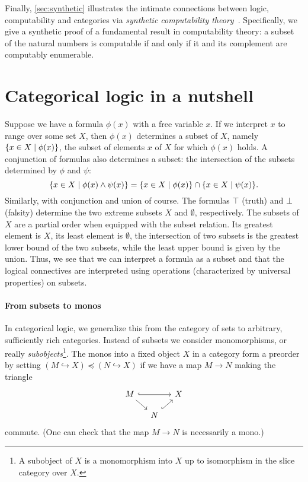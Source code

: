 Finally, \cref{sec:synthetic} illustrates the intimate connections between
logic, computability and categories via \emph{synthetic computability
  theory}~\cite{Bauer2006}. Specifically, we give a synthetic proof of a
fundamental result in computability theory: a subset of the natural numbers is
computable if and only if it and its complement are computably enumerable.


\section{Categorical logic in a nutshell}\label{sec:categorical-logic}
Suppose we have a formula \(\phi(x)\) with a free variable \(x\). If we
interpret \(x\) to range over some set \(X\), then \(\phi(x)\) determines a
subset of \(X\), namely \(\{x \in X \mid \phi(x)\}\), the subset of elements
\(x\) of \(X\) for which \(\phi(x)\) holds.
%
A conjunction of formulas also determines a subset: the
intersection of the subsets determined by \(\phi\) and \(\psi\):
\[
  \{x \in X \mid \phi(x) \land \psi(x)\}
  = \{x \in X \mid \phi(x)\} \cap \{x \in X \mid \psi(x)\}.
\]
Similarly, with conjunction and union of course.
%
The formulas \(\top\) (truth) and \(\bot\) (falsity) determine the two extreme
subsets \(X\) and \(\emptyset\), respectively.
%
The subsets of \(X\) are a partial order when equipped with the subset
relation. Its greatest element is \(X\), its least element is \(\emptyset\), the
intersection of two subsets is the greatest lower bound of the two subsets,
while the least upper bound is given by the union.
%
Thus, we see that we can interpret a formula as a subset and that the logical
connectives are interpreted using operations (characterized by universal
properties) on subsets.

\paragraph{From subsets to monos}
In categorical logic, we generalize this from the category of sets to arbitrary,
sufficiently rich categories.
%
Instead of subsets we consider monomorphisms, or really
\emph{subobjects}\footnote{A subobject of \(X\) is a monomorphism into
  \(X\) up to isomorphism in the slice category over \(X\).}.
%
The monos into a fixed object \(X\) in a category form a preorder by setting
\((M \hookrightarrow X) \preceq (N \hookrightarrow X)\) if we have a map
\(M \to N\) making the triangle
\[
  \begin{tikzcd}[row sep=4mm,column sep=4mm]
    M \ar[dr] \ar[rr,hookrightarrow] & & X \\
    & N \ar[ur,hookrightarrow]
  \end{tikzcd}
\]
commute. (One can check that the map \(M \to N\) is necessarily a mono.)


